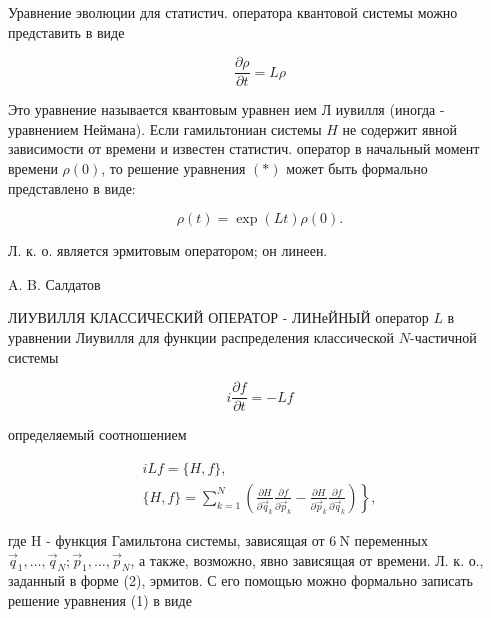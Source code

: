 \documentclass[10pt]{article}
\begin{document}
Уравнение эволюции для статистич. оператора квантовой системы можно представить в виде



\[

\frac{\partial \rho}{\partial t}=L \rho

\]



Это уравнение называется квантовым уравнен ием Л иувилля (иногда - уравнением Неймана). Если гамильтониан системы $H$ не содержит явной зависимости от времени и известен статистич. оператор в начальный момент времени $\rho(0)$, то решение уравнения $(*)$ может быть формально представлено в виде:



\[

\rho(t)=\exp (L t) \rho(0) .

\]



Л. к. о. является эрмитовым оператором; он линеен.



A. B. Салдатов



ЛИУВИЛЛЯ КЛАССИЧЕСКИЙ ОПЕРАТОР - ЛИНеЙНЫЙ оператор $L$ в уравнении Лиувилля для функции распределения классической $N$-частичной системы



\[

i \frac{\partial f}{\partial t}=-L f

\]



определяемый соотношением



\[

\begin{gathered}

i L f=\{H, f\}, \\

\left.\{H, f\}=\sum_{k=1}^{N}\left(\frac{\partial H}{\partial \vec{q}_{k}} \frac{\partial f}{\partial \vec{p}_{k}}-\frac{\partial H}{\partial \vec{p}_{k}} \frac{\partial f}{\partial \vec{q}_{k}}\right)\right\},

\end{gathered}

\]



где $\mathrm{H}$ - функция Гамильтона системы, зависящая от $6 \mathrm{~N}$ переменных $\vec{q}_{1}, \ldots, \vec{q}_{N} ; \vec{p}_{1}, \ldots, \vec{p}_{N}$, а также, возможно, явно зависящая от времени. Л. к. о., заданный в форме (2), эрмитов. С его помощью можно формально записать решение уравнения (1) в виде
\end{document}
